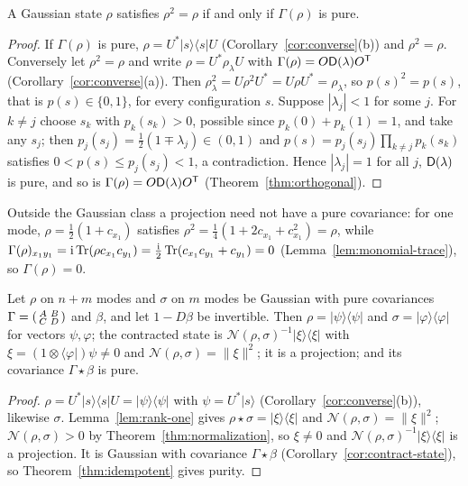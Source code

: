 \begin{theorem}\label{thm:idempotent}
A Gaussian state $\rho$ satisfies $\rho^2=\rho$ if and only if $\Gamma(\rho)$ is pure.
\end{theorem}
\begin{proof}
If $\Gamma(\rho)$ is pure, $\rho=U^*|s\rangle\langle s|U$ (Corollary~\ref{cor:converse}(b)) and
$\rho^2=\rho$. Conversely let $\rho^2=\rho$ and write $\rho=U^*\rho_\lambda U$ with
$\Gamma(\rho)=O\mathsf D(\lambda)O^{\mathsf T}$ (Corollary~\ref{cor:converse}(a)). Then
$\rho_\lambda^2=U\rho^2U^*=U\rho U^*=\rho_\lambda$, so $p(s)^2=p(s)$, that is $p(s)\in\{0,1\}$, for
every configuration $s$. Suppose $|\lambda_j|<1$ for some $j$. For $k\neq j$ choose $s_k$ with
$p_k(s_k)>0$, possible since $p_k(0)+p_k(1)=1$, and take any $s_j$; then
$p_j(s_j)=\tfrac12(1\mp\lambda_j)\in(0,1)$ and $p(s)=p_j(s_j)\prod_{k\neq j}p_k(s_k)$ satisfies
$0<p(s)\leq p_j(s_j)<1$, a contradiction. Hence $|\lambda_j|=1$ for all $j$, $\mathsf D(\lambda)$ is pure,
and so is $\Gamma(\rho)=O\mathsf D(\lambda)O^{\mathsf T}$ (Theorem~\ref{thm:orthogonal}).
\end{proof}
Outside the Gaussian class a projection need not have a pure covariance: for one mode,
$\rho=\tfrac12(1+c_{x_1})$ satisfies $\rho^2=\tfrac14(1+2c_{x_1}+c_{x_1}^2)=\rho$, while
$\Gamma(\rho)_{x_1y_1}=\mathrm i\operatorname{Tr}(\rho c_{x_1}c_{y_1})=\tfrac{\mathrm i}{2}\operatorname{Tr}(c_{x_1}c_{y_1}+c_{y_1})=0$
(Lemma~\ref{lem:monomial-trace}), so $\Gamma(\rho)=0$.

\begin{theorem}\label{thm:pure-contract}
Let $\rho$ on $n+m$ modes and $\sigma$ on $m$ modes be Gaussian with pure covariances
$\Gamma=\begin{psmallmatrix}A&B\\C&D\end{psmallmatrix}$ and $\beta$, and let $1-D\beta$ be
invertible. Then $\rho=|\psi\rangle\langle\psi|$ and $\sigma=|\varphi\rangle\langle\varphi|$ for
vectors $\psi,\varphi$; the contracted state is $\mathcal N(\rho,\sigma)^{-1}|\xi\rangle\langle\xi|$ with
$\xi=(1\otimes\langle\varphi|)\psi\neq0$ and $\mathcal N(\rho,\sigma)=\|\xi\|^2$; it is a
projection; and its covariance $\Gamma\star\beta$ is pure.
\end{theorem}
\begin{proof}
$\rho=U^*|s\rangle\langle s|U=|\psi\rangle\langle\psi|$ with $\psi=U^*|s\rangle$
(Corollary~\ref{cor:converse}(b)), likewise $\sigma$. Lemma~\ref{lem:rank-one} gives
$\rho\star\sigma=|\xi\rangle\langle\xi|$ and $\mathcal N(\rho,\sigma)=\|\xi\|^2$;
$\mathcal N(\rho,\sigma)>0$ by Theorem~\ref{thm:normalization}, so $\xi\neq0$ and
$\mathcal N(\rho,\sigma)^{-1}|\xi\rangle\langle\xi|$ is a projection. It is Gaussian with
covariance $\Gamma\star\beta$ (Corollary~\ref{cor:contract-state}), so
Theorem~\ref{thm:idempotent} gives purity.
\end{proof}

